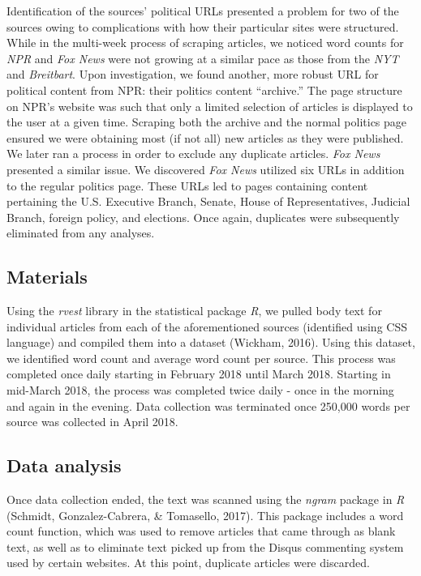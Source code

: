 \documentclass[
  english,
  man]{apa6}
\begin{document}
Identification of the sources' political URLs presented a problem for two of the sources owing to complications with how their particular sites were structured. While in the multi-week process of scraping articles, we noticed word counts for \emph{NPR} and \emph{Fox News} were not growing at a similar pace as those from the \emph{NYT} and \emph{Breitbart}. Upon investigation, we found another, more robust URL for political content from NPR: their politics content ``archive.'' The page structure on NPR's website was such that only a limited selection of articles is displayed to the user at a given time. Scraping both the archive and the normal politics page ensured we were obtaining most (if not all) new articles as they were published. We later ran a process in order to exclude any duplicate articles. \emph{Fox News} presented a similar issue. We discovered \emph{Fox News} utilized six URLs in addition to the regular politics page. These URLs led to pages containing content pertaining the U.S. Executive Branch, Senate, House of Representatives, Judicial Branch, foreign policy, and elections. Once again, duplicates were subsequently eliminated from any analyses.

\hypertarget{materials}{%
\subsection{Materials}\label{materials}}

Using the \emph{rvest} library in the statistical package \emph{R}, we pulled body text for individual articles from each of the aforementioned sources (identified using CSS language) and compiled them into a dataset (Wickham, 2016). Using this dataset, we identified word count and average word count per source. This process was completed once daily starting in February 2018 until March 2018. Starting in mid-March 2018, the process was completed twice daily - once in the morning and again in the evening. Data collection was terminated once 250,000 words per source was collected in April 2018.

\hypertarget{data-analysis}{%
\subsection{Data analysis}\label{data-analysis}}

Once data collection ended, the text was scanned using the \emph{ngram} package in \emph{R} (Schmidt, Gonzalez-Cabrera, \& Tomasello, 2017). This package includes a word count function, which was used to remove articles that came through as blank text, as well as to eliminate text picked up from the Disqus commenting system used by certain websites. At this point, duplicate articles were discarded.
\end{document}
